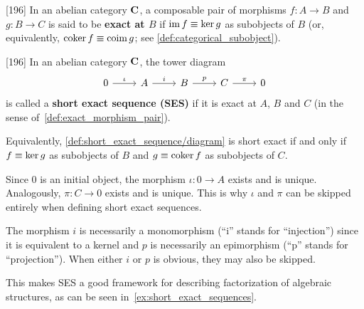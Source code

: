 \begin{definition}\label{def:exact_morphism_pair}\cite{MacLane1994}[196]
  In an abelian category \( \operatorname{\mathbf{C}} \), a composable pair of morphisms \( f: A \to B \) and \( g: B \to C \) is said to be \textbf{exact at \( B \)} if \( \operatorname{im} f \equiv \operatorname{ker} g \) as subobjects of \( B \) (or, equivalently, \( \operatorname{coker} f \equiv \operatorname{coim} g \); see \cref{def:categorical_subobject}).
\end{definition}

\begin{definition}\label{def:short_exact_sequence}\cite{MacLane1994}[196]
  In an abelian category \( \operatorname{\mathbf{C}} \), the tower diagram
  \begin{equation}\label{def:short_exact_sequence/diagram}
    \begin{tikzcd}[baseline=(current bounding box.center)]
      0 \arrow[r, "\iota"] & A \arrow[r, "i"] & B \arrow[r, "p"] & C \arrow[r, "\pi"] & 0
    \end{tikzcd}
  \end{equation}
  is called a \textbf{short exact sequence (SES)} if it is exact at \( A \), \( B \) and \( C \) (in the sense of~\cref{def:exact_morphism_pair}).

  Equivalently, \cref{def:short_exact_sequence/diagram} is short exact if and only if \( f \equiv \operatorname{ker} g \) as subobjects of \( B \) and \( g \equiv \operatorname{coker} f \) as subobjects of \( C \).
\end{definition}

\begin{note}\label{note:short_exact_sequence_factorization}
  Since \( 0 \) is an initial object, the morphism \( \iota: 0 \to A \) exists and is unique. Analogously, \( \pi: C \to 0 \) exists and is unique. This is why \( \iota \) and \( \pi \) can be skipped entirely when defining short exact sequences.

  The morphism \( i \) is necessarily a monomorphism (\enquote{i} stands for \enquote{injection}) since it is equivalent to a kernel and \( p \) is necessarily an epimorphism (\enquote{p} stands for \enquote{projection}). When either \( i \) or \( p \) is obvious, they may also be skipped.

  This makes SES a good framework for describing factorization of algebraic structures, as can be seen in~\cref{ex:short_exact_sequences}.
\end{note}

